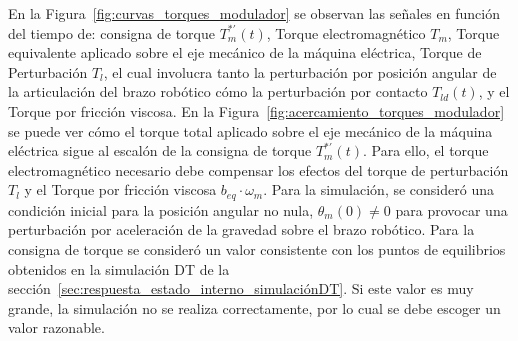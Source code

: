 \documentclass{article}
\begin{document}
En la Figura~\ref{fig:curvas_torques_modulador} se observan las señales en función del tiempo de: consigna de torque \(T^{*'}_m(t)\), Torque electromagnético \(T_m\), Torque equivalente aplicado sobre el eje mecánico de la máquina eléctrica, Torque de Perturbación \(T_l\), el cual involucra tanto la perturbación por posición angular de la articulación del brazo robótico cómo la perturbación por contacto \(T_{ld}(t)\), y el Torque por fricción viscosa. En la Figura~\ref{fig:acercamiento_torques_modulador} se puede ver cómo el torque total aplicado sobre el eje mecánico de la máquina eléctrica sigue al escalón de la consigna de torque \(T^{*'}_m(t)\). Para ello, el torque electromagnético necesario debe compensar los efectos del torque de perturbación \(T_l\) y el Torque por fricción viscosa \(b_{eq} \cdot \omega_m\). Para la simulación, se consideró una condición inicial para la posición angular no nula, \(\theta_m(0) \neq 0\) para provocar una perturbación por aceleración de la gravedad sobre el brazo robótico. Para la consigna de torque se consideró un valor consistente con los puntos de equilibrios obtenidos en la simulación DT de la sección~\ref{sec:respuesta_estado_interno_simulaciónDT}. Si este valor es muy grande, la simulación no se realiza correctamente, por lo cual se debe escoger un valor razonable.
\end{document}
